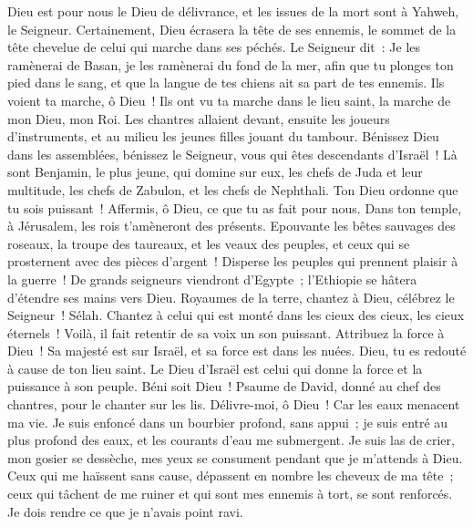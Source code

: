 \begin{multicols}{2}
Dieu est pour nous le Dieu de délivrance, et les issues de la mort sont à Yahweh, le Seigneur.
Certainement, Dieu écrasera la tête de ses ennemis, le sommet de la tête chevelue de celui qui marche dans ses péchés.
Le Seigneur dit~: Je les ramènerai de Basan, je les ramènerai du fond de la mer,
afin que tu plonges ton pied dans le sang, et que la langue de tes chiens ait sa part de tes ennemis.
Ils voient ta marche, ô Dieu~! Ils ont vu ta marche dans le lieu saint, la marche de mon Dieu, mon Roi.
Les chantres allaient devant, ensuite les joueurs d'instruments, et au milieu les jeunes filles jouant du tambour.
Bénissez Dieu dans les assemblées, bénissez le Seigneur, vous qui êtes descendants d'Israël~!
Là sont Benjamin, le plus jeune, qui domine sur eux, les chefs de Juda et leur multitude, les chefs de Zabulon, et les chefs de Nephthali.
Ton Dieu ordonne que tu sois puissant~! Affermis, ô Dieu, ce que tu as fait pour nous.
Dans ton temple, à Jérusalem, les rois t'amèneront des présents.
Epouvante les bêtes sauvages des roseaux, la troupe des taureaux, et les veaux des peuples, et ceux qui se prosternent avec des pièces d'argent~! Disperse les peuples qui prennent plaisir à la guerre~!
De grands seigneurs viendront d'Egypte~; l'Ethiopie se hâtera d'étendre ses mains vers Dieu.
Royaumes de la terre, chantez à Dieu, célébrez le Seigneur~! Sélah.
Chantez à celui qui est monté dans les cieux des cieux, les cieux éternels~! Voilà, il fait retentir de sa voix un son puissant.
Attribuez la force à Dieu~! Sa majesté est sur Israël, et sa force est dans les nuées.
Dieu, tu es redouté à cause de ton lieu saint. Le Dieu d'Israël est celui qui donne la force et la puissance à son peuple. Béni soit Dieu~!
\VerseOne{}Psaume de David, donné au chef des chantres, pour le chanter sur les lis.
Délivre-moi, ô Dieu~! Car les eaux menacent ma vie.
Je suis enfoncé dans un bourbier profond, sans appui~; je suis entré au plus profond des eaux, et les courants d'eau me submergent.
Je suis las de crier, mon gosier se dessèche, mes yeux se consument pendant que je m'attends à Dieu.
Ceux qui me haïssent sans cause, dépassent en nombre les cheveux de ma tête~; ceux qui tâchent de me ruiner et qui sont mes ennemis à tort, se sont renforcés. Je dois rendre ce que je n'avais point ravi.

\end{multicols}
